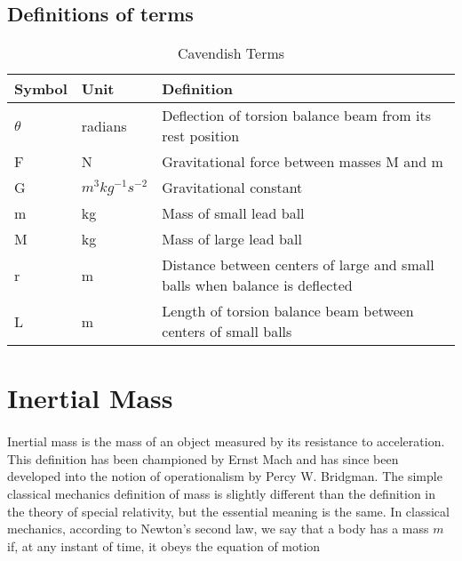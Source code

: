 \documentclass{book}
\begin{document}
    \subsection{Definitions of terms}
    \begin{table}[h]
        \centering
        \begin{tabular}{lll}
            \hline
            \textbf{Symbol} & \textbf{Unit} & \textbf{Definition}\\
            \hline
            $\theta$ & radians & Deflection of torsion balance beam from its rest position\\
            \hdashline[3pt/5pt]
            F & N & Gravitational force between masses M and m\\
            \hdashline[3pt/5pt]
            G & $m^3 kg^{-1} s^{-2}$ & Gravitational constant\\
            \hdashline[3pt/5pt]
            m & kg & Mass of small lead ball\\
            \hdashline[3pt/5pt]
            M & kg & Mass of large lead ball\\
            \hdashline[3pt/5pt]
            r & m & Distance between centers of large and small balls when balance is deflected\\
            \hdashline[3pt/5pt]
            L & m & Length of torsion balance beam between centers of small balls\\
            \hline
        \end{tabular}
        \caption{Cavendish Terms}
        \label{tbl:cavendish_terms}
    \end{table}
    
    \section{Inertial Mass}
    \paragraph{}
    Inertial mass is the mass of an object measured by its resistance to acceleration. This definition has been championed by Ernst Mach and has since been developed into the notion of operationalism by Percy W. Bridgman. The simple classical mechanics definition of mass is slightly different than the definition in the theory of special relativity, but the essential meaning is the same. In classical mechanics, according to Newton's second law, we say that a body has a mass $m$ if, at any instant of time, it obeys the equation of motion
    
\end{document}
